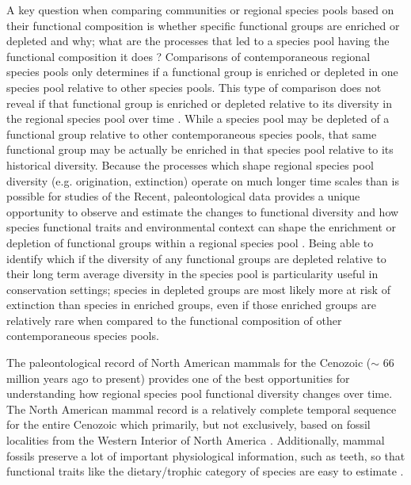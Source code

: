 \documentclass[12pt,letterpaper]{article}
\begin{document}
A key question when comparing communities or regional species pools based on their functional composition is whether specific functional groups are enriched or depleted and why; what are the processes that led to a species pool having the functional composition it does \citep{Mcgill2006,Weber2017,Brown1989,Smith2008b,Blois2009}? Comparisons of contemporaneous regional species pools only determines if a functional group is enriched or depleted in one species pool relative to other species pools. This type of comparison does not reveal if that functional group is enriched or depleted relative to its diversity in the regional species pool over time \citep{Blois2009}. While a species pool may be depleted of a functional group relative to other contemporaneous species pools, that same functional group may be actually be enriched in that species pool relative to its historical diversity. Because the processes which shape regional species pool diversity (e.g. origination, extinction) operate on much longer time scales than is possible for studies of the Recent, paleontological data provides a unique opportunity to observe and estimate the changes to functional diversity and how species functional traits and environmental context can shape the enrichment or depletion of functional groups within a regional species pool \citep{Blois2009,Smith2008b}. Being able to identify which if the diversity of any functional groups are depleted relative to their long term average diversity in the species pool is particularity useful in conservation settings; species in depleted groups are most likely more at risk of extinction than species in enriched groups, even if those enriched groups are relatively rare when compared to the functional composition of other contemporaneous species pools.

The paleontological record of North American mammals for the Cenozoic (\(\sim\) 66 million years ago to present) provides one of the best opportunities for understanding how regional species pool functional diversity changes over time. The North American mammal record is a relatively complete temporal sequence for the entire Cenozoic which primarily, but not exclusively, based on fossil localities from the Western Interior of North America \citep{Alroy1996a,Alroy2000g,Alroy2009}. Additionally, mammal fossils preserve a lot of important physiological information, such as teeth, so that functional traits like the dietary/trophic category of species are easy to estimate \citep{Polly2015a,Polly2011b,Eronen2010a}.
\end{document}
